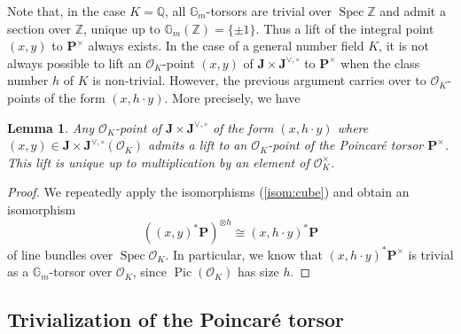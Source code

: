 \documentclass[11pt,oneside]{amsart}
\theoremstyle{plain}
\newtheorem{lemma}[theorem]{Lemma}
\theoremstyle{definition}
\def\G{{\bf G}}
\DeclareMathOperator{\Gm}{\mathbb{G}_m}
\DeclareMathOperator{\Pic}{Pic}
\DeclareMathOperator{\spec}{Spec} \DeclareMathOperator{\sgn}{sign}
\def\Z{\mathbb{Z}}
\def\Q{\mathbb{Q}}
\def\J{\mathbf{J}}
\def\Jo{\mathbf{J}^{\vee,\circ}}
\def\G{\mathbb{G}}
\def\P{\mathbf{P}}
\def\Gm{{\mathbb{G}_m}}
\def\oh{\mathcal{O}}
\begin{document}
Note that, in the case $K=\Q$, all $\Gm$-torsors are trivial over $\spec \Z$ and admit a section over $\Z$, unique up to $\G_m(\Z)=\{ \pm 1 \}$. Thus a lift of the integral point $(x, y)$ to $\P^\times$ always exists. 
 In the case of a general number field $K$, it is not always possible to lift an $\oh_K$-point $(x, y)$ of $\J\times \Jo$ to $\P^\times$ when the class number $h$ of $K$ is non-trivial. However, the previous argument carries over to $\oh_K$-points of the form $(x, h\cdot y)$. More precisely, we have 

\begin{lemma}\label{lem:h}
Any $\oh_K$-point of $\J\times \Jo$ of the form $(x, h\cdot y)$ where $(x, y)\in \J\times \Jo (\oh_K)$ admits a lift to an $\oh_K$-point of the Poincar\'e torsor $\P^\times$. This lift is unique up to multiplication by an element of $\oh_K^\times$.
\end{lemma}

\begin{proof}
We repeatedly apply the isomorphisms (\ref{isom:cube}) %
and obtain an isomorphism
$$
    ((x, y)^* \P)^{\otimes h} \cong (x, h\cdot y)^* \P
$$
of line bundles over $\spec \oh_K$. In particular, we know that $(x, h\cdot y)^* \P^\times$ is trivial as a $\G_m$-torsor over $\oh_K$, since $\Pic (\oh_K)$ has size $h$. 
\end{proof}



\subsection{Trivialization of the Poincar\'e torsor} \label{trivialization}




\end{document}
